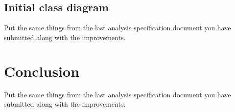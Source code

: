 \subsection{Initial class diagram} %
\label{sub:initial_class_diagram}
Put the same things from the last analysis specification document you have submitted along with the improvements.

\section{Conclusion} %
Put the same things from the last analysis specification document you have submitted along with the improvements.
